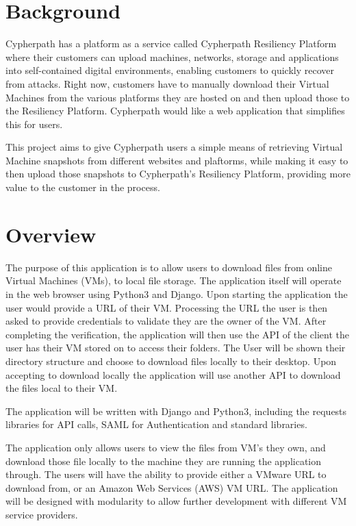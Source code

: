 \documentclass{article}
\begin{document}
    \section{Background}
    Cypherpath has a platform as a service called Cypherpath Resiliency Platform where their customers can upload machines, networks, storage and applications into
    self-contained digital environments, enabling customers to quickly recover from attacks. Right now, customers have to manually download their Virtual Machines from
    the various platforms they are hosted on and then upload those to the Resiliency Platform. Cypherpath would like a web application that simplifies this for users.

	This project aims to give Cypherpath users a simple means of retrieving Virtual Machine snapshots from different websites and plaftorms, while making it easy to 
	then upload those snapshots to Cypherpath's Resiliency Platform, providing more value to the customer in the process.


    \section{Overview}
    The purpose of this application is to allow users to download files from online Virtual Machines (VMs), to local file storage.
    The application itself will operate in the web browser using Python3 and Django. Upon starting the application the user would
    provide a URL of their VM. Processing the URL the user is then asked to provide credentials to validate they are the owner of
    the VM. After completing the verification, the application will then use the API of the client the user has their VM stored on
    to access their folders. The User will be shown their directory structure and choose to download files locally to their desktop.
    Upon accepting to download locally the application will use another API to download the files local to their VM.

    The application will be written with Django and Python3, including the requests libraries for API calls, SAML for Authentication
    and standard libraries.

    The application only allows users to view the files from VM's they own, and download those file locally to the machine they 
    are running the application through. The users will have the ability to provide either a VMware URL to download from, or an
    Amazon Web Services (AWS) VM URL. The application will be designed with modularity to allow further 
    development with different VM service providers.  
\end{document}
